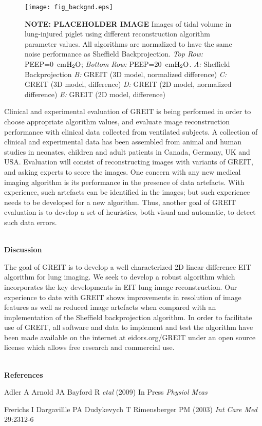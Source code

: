 \documentclass[12pt]{article}
\newcommand{\mysection}[1]{
~\\ \noindent
{\bf \normalsize #1}
\vspace{1mm}
}
\begin{document}
\vspace{-6mm}
\begin{figure}[htp]
\centering
\texttt{[image: fig\_backgnd.eps]}
\vspace{-4mm}
\caption{%
\small
{\bf NOTE: PLACEHOLDER IMAGE}
Images of tidal volume in lung-injured piglet
\cite{frerichs03} using different reconstruction
algorithm parameter values. All algorithms are normalized to have
the same noise performance as Sheffield Backprojection.
{\em Top Row:} P{\footnotesize EEP=}0~cm$\rm H_{2}O$;
{\em Bottom Row:} P{\footnotesize EEP=}20~cm$\rm H_{2}O$.
{\em A:} Sheffield Backprojection
{\em B:} GREIT (3D model, normalized difference)
{\em C:} GREIT (3D model, difference)
{\em D:} GREIT (2D model, normalized difference)
{\em E:} GREIT (2D model, difference)
}
\label{fig:figbackgnd}
\end{figure}

Clinical and experimental evaluation of GREIT is being
performed in order to choose appropriate algorithm values,
and evaluate image reconstruction performance with 
clinical data collected from ventilated subjects.
A collection of clinical and experimental data has been assembled from
animal and human studies in neonates, children and adult patients in
Canada, Germany, UK and USA.  Evaluation will consist
of reconstructing images with variants of GREIT, and
asking experts to score the images.  One concern with any
new medical imaging algorithm is its performance in the
presence of data artefacts. With experience, such artefacts
can be identified in the images; but such experience needs
to be developed for a new algorithm.  Thus, another goal
of GREIT evaluation is to develop a set of heuristics,
both visual and automatic, to detect such data errors.


\vspace{-3mm}
\mysection{Discussion}

The goal of GREIT is to develop a well characterized 2D
linear difference EIT algorithm for lung imaging. We seek to develop
a robust algorithm which incorporates the key developments
in EIT lung image reconstruction. Our experience to date
with GREIT shows improvements in resolution of image features
as well as reduced image artefacts when compared with an
implementation of the Sheffield backprojection
algorithm. In order to facilitate use of GREIT,
all software
and data to implement and test the algorithm have been
made available on the internet at eidors.org/GREIT under
an open source license which allows free research and
commercial use.

\mysection{References}
\begin{thebibliography}{9}
\setlength{\itemsep}{-2mm}
\vspace{-1.8cm}
Adler A  Arnold JA Bayford R {\em etal} (2009)
In Press {\em Physiol Meas}

Frerichs I Dargavillle PA Dudykevych T Rimensberger PM (2003) 
{\em Int Care Med} 29:2312-6

\end{thebibliography}
\end{document}
